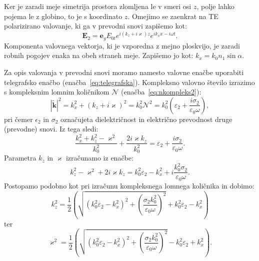Ker je zaradi meje simetrija prostora zlomljena le v smeri osi $z$, polje
lahko pojema le z globino, to je s koordinato $z$. 
Omejimo se zaenkrat na TE polarizirano valovanje, ki 
ga v prevodni snovi zapišemo kot:
\begin{equation}
\mathbf{E}_2 = \mathbf{e}_y E_{0t} e^{i(k_z+i\varkappa)z} e^{ik_xx-i\omega t}.
\label{eq:04_89}
\end{equation}
Komponenta valovnega vektorja, ki je vzporedna z mejno ploskvijo, je zaradi
robnih pogojev enaka na obeh straneh meje. Zapišemo jo kot: $k_x = k_0 n_1 \sin \alpha$. 

Za opis valovanja v prevodni snovi moramo namesto valovne enačbe uporabiti telegrafsko enačbo 
(enačba~\ref{eq:telegrafska}). Kompleksno valovno število izrazimo s
kompleksnim lomnim količnikom $\mathcal{N}$ (enačba~\ref{eq:nkompleks2}):
\begin{equation}
|\tilde{\mathbf{k}}|^2 = k_x^2 + (k_z+i\varkappa)^2 = k_0^2 \mathcal{N}^2  = 
k_0^2 \left(\varepsilon_2 + \frac{i\sigma_2}{\varepsilon_0 \omega}\right)\!\!,
\label{eq:04_90}
\end{equation}
pri čemer $\epsilon_2$ in $\sigma_2$ označujeta dielektričnost in električno
prevodnost druge (prevodne) snovi. Iz tega sledi:
\begin{equation}
\frac{k_x^2+k_z^2 - \varkappa^2}{k_0^2} + \frac{2 i \varkappa k_z}{k_0^2} = \varepsilon_2 + 
\frac{i \sigma_2}{\varepsilon_0 \omega}.
\label{eq:04_91}
\end{equation}
Parametra $k_z$ in $\varkappa$ izračunamo iz enačbe:
\begin{equation}
k_z^2 - \varkappa^2+ 2 i \varkappa k_z= k_0^2 \varepsilon_2 - k_x^2 + i\frac{k_0^2\sigma_2}{\varepsilon_0 \omega}.
\label{eq:04_92}
\end{equation}
Postopamo podobno kot pri izračunu kompleksnega lomnega količnika in dobimo:
\begin{equation}
k_z^2 = \frac{1}{2}\left(\sqrt{\left(k_0^2\varepsilon_2-k_x^2\right)^2 + \left(\frac{\sigma_2 k_0^2}{\varepsilon_0 \omega}\right)^2}
+ k_0^2\varepsilon_2-k_x^2 \right)
\label{eq:04_93}
\end{equation}
ter
\begin{equation}
\varkappa^2 = \frac{1}{2}\left(\sqrt{\left(k_0^2\varepsilon_2-k_x^2\right)^2 + \left(\frac{\sigma_2 k_0^2}{\varepsilon_0 \omega}\right)^2}
- k_0^2\varepsilon_2+k_x^2\right)\!\!.
\label{eq:04_94}
\end{equation}
